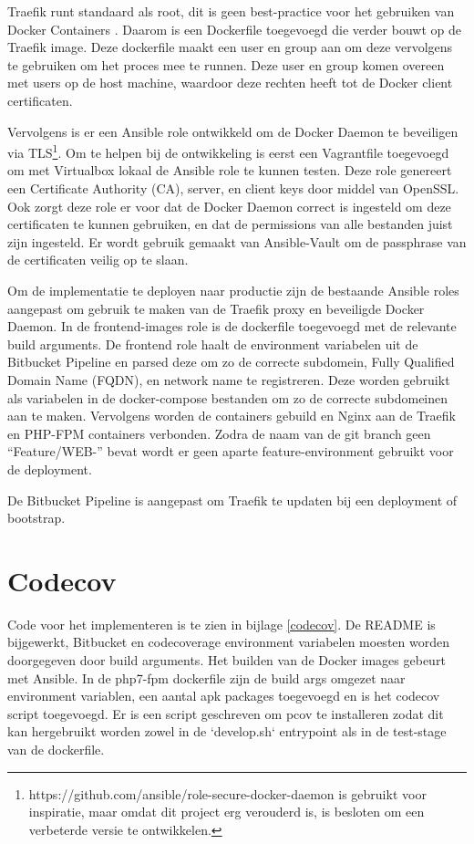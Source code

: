 Traefik runt standaard als root, dit is geen best-practice voor het gebruiken van Docker Containers \parencite{DockerBestPractices}. Daarom is een Dockerfile toegevoegd die verder bouwt op de Traefik image. Deze dockerfile maakt een user en group aan om deze vervolgens te gebruiken om het proces mee te runnen. Deze user en group komen overeen met users op de host machine, waardoor deze rechten heeft tot de Docker client certificaten.

Vervolgens is er een Ansible role ontwikkeld om de Docker Daemon te beveiligen via TLS\footnote{https://github.com/ansible/role-secure-docker-daemon is gebruikt voor inspiratie, maar omdat dit project erg verouderd is, is besloten om een verbeterde versie te ontwikkelen.}. Om te helpen bij de ontwikkeling is eerst een Vagrantfile toegevoegd om met Virtualbox lokaal de Ansible role te kunnen testen. Deze role genereert een Certificate Authority (CA), server, en client keys door middel van OpenSSL. Ook zorgt deze role er voor dat de Docker Daemon correct is ingesteld om deze certificaten te kunnen gebruiken, en dat de permissions van alle bestanden juist zijn ingesteld. Er wordt gebruik gemaakt van Ansible-Vault om de passphrase van de certificaten veilig op te slaan.

Om de implementatie te deployen naar productie zijn de bestaande Ansible roles aangepast om gebruik te maken van de Traefik proxy en beveiligde Docker Daemon. In de frontend-images role is de dockerfile toegevoegd met de relevante build arguments. De frontend role haalt de environment variabelen uit de Bitbucket Pipeline en parsed deze om zo de correcte subdomein, Fully Qualified Domain Name (FQDN), en network name te registreren. Deze worden gebruikt als variabelen in de docker-compose bestanden om zo de correcte subdomeinen aan te maken. Vervolgens worden de containers gebuild en Nginx aan de Traefik en PHP-FPM containers verbonden. Zodra de naam van de git branch geen \enquote{Feature/WEB-} bevat wordt er geen aparte feature-environment gebruikt voor de deployment.

De Bitbucket Pipeline is aangepast om Traefik te updaten bij een deployment of bootstrap.

\section{Codecov}
Code voor het implementeren is te zien in bijlage \ref{codecov}. De README is bijgewerkt, Bitbucket en codecoverage environment variabelen moesten worden doorgegeven door build arguments. Het builden van de Docker images gebeurt met Ansible. In de php7-fpm dockerfile zijn de build args omgezet naar environment variablen, een aantal apk packages toegevoegd en is het codecov script toegevoegd. Er is een script geschreven om pcov te installeren zodat dit kan hergebruikt worden zowel in de `develop.sh` entrypoint als in de test-stage van de dockerfile.

